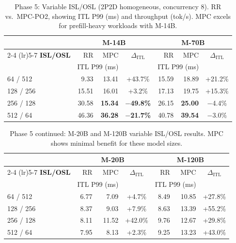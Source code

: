 \documentclass[runningheads]{llncs}
\begin{document}
\begin{table}[t]
\caption{Phase 5: Variable ISL/OSL (2P2D homogeneous, concurrency 8). RR vs.\ MPC-PO2, showing ITL P99 (ms) and throughput (tok/s). MPC excels for prefill-heavy workloads with M-14B.}
\label{tab:phase5}
\centering
\small
\setlength{\tabcolsep}{3pt}
\begin{tabular}{l rr c rr c}
\toprule
& \multicolumn{3}{c}{\textbf{M-14B}} & \multicolumn{3}{c}{\textbf{M-70B}} \\
\cmidrule(lr){2-4} \cmidrule(lr){5-7}
\textbf{ISL/OSL} & RR & MPC & $\Delta_{\text{ITL}}$ & RR & MPC & $\Delta_{\text{ITL}}$ \\
& \multicolumn{2}{c}{ITL P99 (ms)} & & \multicolumn{2}{c}{ITL P99 (ms)} & \\
\midrule
64 / 512   & 9.33  & 13.41 & +43.7\% & 15.59 & 18.89 & +21.2\% \\
128 / 256  & 15.51 & 16.01 & +3.2\%  & 17.13 & 19.75 & +15.3\% \\
256 / 128  & 30.58 & \textbf{15.34} & \textbf{$-$49.8\%} & 26.15 & \textbf{25.00} & $-$4.4\% \\
512 / 64   & 46.36 & \textbf{36.28} & \textbf{$-$21.7\%} & 40.78 & \textbf{39.54} & $-$3.0\% \\
\bottomrule
\end{tabular}
\end{table}

\begin{table}[t]
\caption{Phase 5 continued: M-20B and M-120B variable ISL/OSL results. MPC shows minimal benefit for these model sizes.}
\label{tab:phase5b}
\centering
\small
\setlength{\tabcolsep}{3pt}
\begin{tabular}{l rr c rr c}
\toprule
& \multicolumn{3}{c}{\textbf{M-20B}} & \multicolumn{3}{c}{\textbf{M-120B}} \\
\cmidrule(lr){2-4} \cmidrule(lr){5-7}
\textbf{ISL/OSL} & RR & MPC & $\Delta_{\text{ITL}}$ & RR & MPC & $\Delta_{\text{ITL}}$ \\
& \multicolumn{2}{c}{ITL P99 (ms)} & & \multicolumn{2}{c}{ITL P99 (ms)} & \\
\midrule
64 / 512   & 6.77  & 7.09  & +4.7\%  & 8.49  & 10.85 & +27.8\% \\
128 / 256  & 8.37  & 9.03  & +7.9\%  & 8.63  & 13.39 & +55.2\% \\
256 / 128  & 8.11  & 11.52 & +42.0\% & 9.76  & 12.67 & +29.8\% \\
512 / 64   & 7.95  & 8.13  & +2.3\%  & 9.25  & 13.23 & +43.0\% \\
\bottomrule
\end{tabular}
\end{table}
\end{document}
